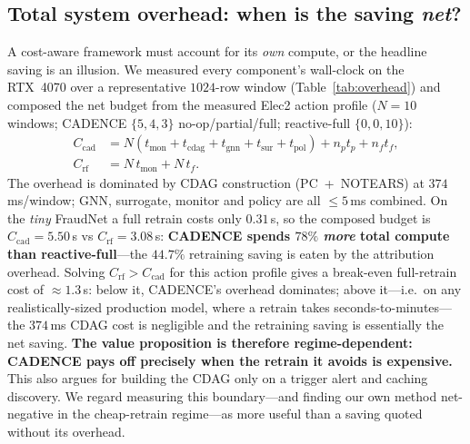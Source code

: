 \documentclass[conference]{IEEEtran}
\begin{document}
\subsection{Total system overhead: when is the saving \emph{net}?}\label{sec:overhead}
A cost-aware framework must account for its \emph{own} compute, or the
headline saving is an illusion. We measured every component's wall-clock
on the RTX~4070 over a representative $1024$-row window
(Table~\ref{tab:overhead}) and composed the net budget from the measured
Elec2 action profile ($N{=}10$ windows; CADENCE $\{5,4,3\}$ no-op/partial/full;
reactive-full $\{0,0,10\}$):
\begin{align}
C_{\text{cad}} &= N(t_{\text{mon}}{+}t_{\text{cdag}}{+}t_{\text{gnn}}{+}t_{\text{sur}}{+}t_{\text{pol}}) + n_p t_p + n_f t_f,\nonumber\\
C_{\text{rf}} &= N\,t_{\text{mon}} + N\,t_f .
\end{align}
The overhead is dominated by CDAG construction (PC~+~NOTEARS) at
$374$\,ms/window; GNN, surrogate, monitor and policy are all $\le5$\,ms
combined. On the \emph{tiny} FraudNet a full retrain costs only $0.31$\,s,
so the composed budget is $C_{\text{cad}}{=}5.50$\,s vs
$C_{\text{rf}}{=}3.08$\,s: \textbf{CADENCE spends $78\%$ \emph{more} total
compute than reactive-full}---the $44.7\%$ retraining saving is eaten by
the attribution overhead. Solving $C_{\text{rf}}>C_{\text{cad}}$ for this
action profile gives a break-even full-retrain cost of $\approx\!1.3$\,s:
below it, CADENCE's overhead dominates; above it---i.e.\ on any
realistically-sized production model, where a retrain takes
seconds-to-minutes---the $374$\,ms CDAG cost is negligible and the
retraining saving is essentially the net saving. \textbf{The value
proposition is therefore regime-dependent: CADENCE pays off precisely
when the retrain it avoids is expensive.} This also argues for building
the CDAG only on a trigger alert and caching discovery. We regard
measuring this boundary---and finding our own method net-negative in the
cheap-retrain regime---as more useful than a saving quoted without its
overhead.
\end{document}
